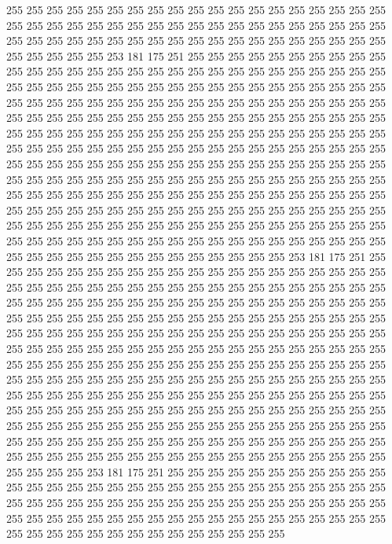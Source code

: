 255 255 255 255 255 255 255 255 255 255 255 255 255 255 255 255 255 255 255 255
255 255 255 255 255 255 255 255 255 255 255 255 255 255 255 255 255 255 255 255
255 255 255 255 255 255 255 255 255 255 255 255 255 255 255 255 255 255 255 255
255 255 253 181 175 251 255 255 255 255 255 255 255 255 255 255 255 255 255 255
255 255 255 255 255 255 255 255 255 255 255 255 255 255 255 255 255 255 255 255
255 255 255 255 255 255 255 255 255 255 255 255 255 255 255 255 255 255 255 255
255 255 255 255 255 255 255 255 255 255 255 255 255 255 255 255 255 255 255 255
255 255 255 255 255 255 255 255 255 255 255 255 255 255 255 255 255 255 255 255
255 255 255 255 255 255 255 255 255 255 255 255 255 255 255 255 255 255 255 255
255 255 255 255 255 255 255 255 255 255 255 255 255 255 255 255 255 255 255 255
255 255 255 255 255 255 255 255 255 255 255 255 255 255 255 255 255 255 255 255
255 255 255 255 255 255 255 255 255 255 255 255 255 255 255 255 255 255 255 255
255 255 255 255 255 255 255 255 255 255 255 255 255 255 255 255 255 255 255 255
255 255 255 255 255 255 255 255 255 255 255 255 255 255 255 255 255 255 255 255
255 255 255 255 255 255 255 255 255 255 255 255 255 255 255 255 255 255 255 255
255 255 255 255 255 255 255 255 255 255 255 255 255 255 255 255 255 255 253 181
175 251 255 255 255 255 255 255 255 255 255 255 255 255 255 255 255 255 255 255
255 255 255 255 255 255 255 255 255 255 255 255 255 255 255 255 255 255 255 255
255 255 255 255 255 255 255 255 255 255 255 255 255 255 255 255 255 255 255 255
255 255 255 255 255 255 255 255 255 255 255 255 255 255 255 255 255 255 255 255
255 255 255 255 255 255 255 255 255 255 255 255 255 255 255 255 255 255 255 255
255 255 255 255 255 255 255 255 255 255 255 255 255 255 255 255 255 255 255 255
255 255 255 255 255 255 255 255 255 255 255 255 255 255 255 255 255 255 255 255
255 255 255 255 255 255 255 255 255 255 255 255 255 255 255 255 255 255 255 255
255 255 255 255 255 255 255 255 255 255 255 255 255 255 255 255 255 255 255 255
255 255 255 255 255 255 255 255 255 255 255 255 255 255 255 255 255 255 255 255
255 255 255 255 255 255 255 255 255 255 255 255 255 255 255 255 255 255 255 255
255 255 255 255 255 255 255 255 255 255 255 255 255 255 255 255 255 255 255 255
255 255 255 255 255 255 255 255 255 255 255 255 255 255 253 181 175 251 255 255
255 255 255 255 255 255 255 255 255 255 255 255 255 255 255 255 255 255 255 255
255 255 255 255 255 255 255 255 255 255 255 255 255 255 255 255 255 255 255 255
255 255 255 255 255 255 255 255 255 255 255 255 255 255 255 255 255 255 255 255
255 255 255 255 255 255 255 255 255 255 255 255 255 255 255 255 255 255 255 255
